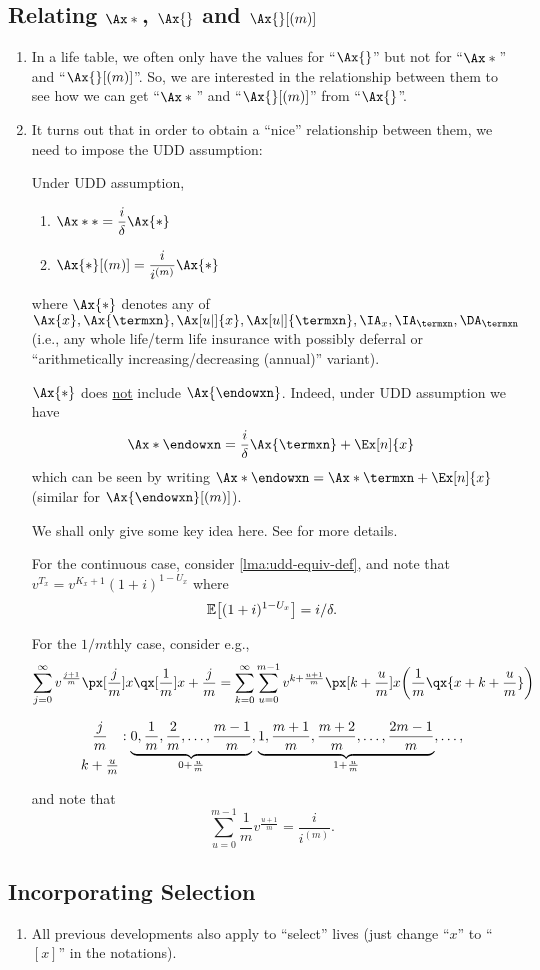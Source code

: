 \subsection{Relating \(\Ax*{}\), \(\Ax{}\) and \(\Ax{}[(m)]\)}
\begin{enumerate}
\item In a life table, we often only have the values for ``\(\Ax{}\)'' but not for
``\(\Ax*{}\)'' and ``\(\Ax{}[(m)]\)''. So, we are interested in the
relationship between them to see how we can get ``\(\Ax*{}\)'' and ``\(\Ax{}[(m)]\)''
from ``\(\Ax{}\)''.
\item It turns out that in order to obtain a ``nice'' relationship between them, we
need to impose the UDD assumption:
\begin{proposition}
\label{prp:udd-relate-insurance-apvs}
Under UDD assumption,
\begin{enumerate}
\item \(\displaystyle\Ax*{*}=\frac{i}{\delta}\Ax{*}\)
\item \(\displaystyle\Ax{*}[(m)]=\frac{i}{i^{(m)}}\Ax{*}\)
\end{enumerate}
where \(\Ax{*}\) denotes any of \(\Ax{x},\Ax{\termxn}, \Ax[u|]{x}, \Ax[u|]{\termxn}, \IA_x,
\IA_{\termxn}, \DA_{\termxn}\) (i.e., any whole life/term life insurance with
possibly deferral or ``arithmetically increasing/decreasing (annual)''
variant).
\end{proposition}
\begin{warning}
\(\Ax{*}\) does \underline{not} include \(\Ax{\endowxn}\). Indeed, under UDD
assumption we have
\[
\Ax*{\endowxn}=\frac{i}{\delta}\Ax{\termxn}+\Ex[n]{x}
\]
which can be seen by writing \(\Ax*{\endowxn}=\Ax*{\termxn}+\Ex[n]{x}\)
(similar for \(\Ax{\endowxn}[(m)]\)).
\end{warning}

\begin{pf}
We shall only give some key idea here. See
\textcite[Section~4.4]{bowers1997actuarial} for more details.

For the continuous case, consider \cref{lma:udd-equiv-def}, and note that
\(v^{T_x}=v^{K_x+1}(1+i)^{1-U_x}\) where \[\mathbb{E}\qty[(1+i)^{1-U_x}]=i/\delta.\]

For the \(1/m\)thly case, consider e.g.,
\[
\sum_{j=0}^{\infty}v^{\frac{j+1}{m}}\px[\frac{j}{m}]{x}\qx[\frac{1}{m}]{x+\frac{j}{m}}
=\sum_{k=0}^{\infty}\sum_{u=0}^{m-1}v^{k+\frac{u+1}{m}}\px[k+\frac{u}{m}]{x}\qty(\frac{1}{m}\qx{x+k+\frac{u}{m}})
\]
\begin{intuition}
\[
\stackunder[7pt]{\(\displaystyle \frac{j}{m}\)}{\(k+\frac{u}{m}\)}:\underbrace{0,\frac{1}{m},\frac{2}{m},\dotsc,\frac{m-1}{m}}_{0+\frac{u}{m}},
\underbrace{1,\frac{m+1}{m},\frac{m+2}{m},\dotsc,\frac{2m-1}{m}}_{1+\frac{u}{m}}
,\dotsc,
\]
\end{intuition}

and note that
\[
\sum_{u=0}^{m-1}\frac{1}{m}v^{\frac{u+1}{m}}=\frac{i}{i^{(m)}}.
\]
\end{pf}
\end{enumerate}
\subsection{Incorporating Selection}
\begin{enumerate}
\item All previous developments also apply to ``select'' lives (just change
``\(x\)'' to ``\([x]\)'' in the notations).
\end{enumerate}
